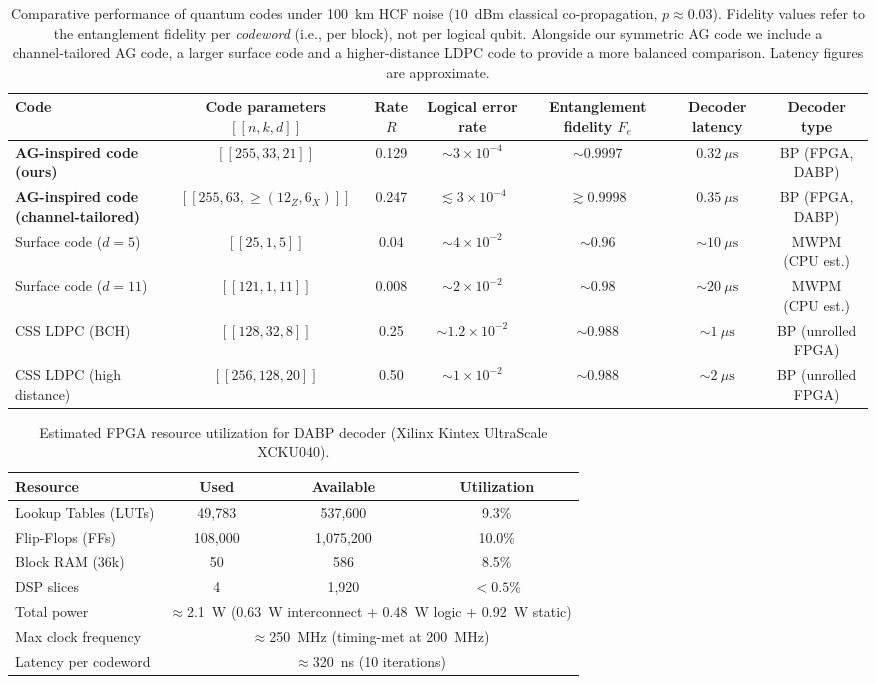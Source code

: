 \documentclass[conference]{IEEEtran}  %
\begin{document}
\begin{table*}[t]
\centering
\caption{Comparative performance of quantum codes under 100~km HCF noise ($10$~dBm classical co-propagation, $p\approx 0.03$).  Fidelity values refer to the entanglement fidelity per \emph{codeword} (i.e., per block), not per logical qubit.  Alongside our symmetric AG code we include a channel‑tailored AG code, a larger surface code and a higher-distance LDPC code to provide a more balanced comparison.  Latency figures are approximate.}
\label{tab:perf}
\begin{tabular}{lcccccc}
\hline
\textbf{Code} & \textbf{Code parameters $[[n,k,d]]$} & \textbf{Rate $R$} & \textbf{Logical error rate} & \textbf{Entanglement fidelity $F_e$} & \textbf{Decoder latency} & \textbf{Decoder type} \\
\hline
\textbf{AG-inspired code (ours)} & $[[255,33,21]]$ & 0.129 & $\sim3\times 10^{-4}$ & $\sim0.9997$ & $0.32~\mu\text{s}$ & BP (FPGA, DABP) \\
\textbf{AG-inspired code (channel-tailored)} & $[[255,63,\ge(12_Z,6_X)]]$ & 0.247 & $\lesssim3\times 10^{-4}$ & $\gtrsim0.9998$ & $0.35~\mu\text{s}$ & BP (FPGA, DABP) \\
Surface code ($d=5$) & $[[25,1,5]]$ & 0.04 & $\sim4\times 10^{-2}$ & $\sim0.96$ & $\sim10~\mu\text{s}$ & MWPM (CPU est.) \\
Surface code ($d=11$) & $[[121,1,11]]$ & 0.008 & $\sim2\times 10^{-2}$ & $\sim0.98$ & $\sim20~\mu\text{s}$ & MWPM (CPU est.) \\
CSS LDPC (BCH) & $[[128,32,8]]$ & 0.25 & $\sim1.2\times 10^{-2}$ & $\sim0.988$ & $\sim1~\mu\text{s}$ & BP (unrolled FPGA) \\
CSS LDPC (high distance) & $[[256,128,20]]$ & 0.50 & $\sim1\times 10^{-2}$ & $\sim0.988$ & $\sim2~\mu\text{s}$ & BP (unrolled FPGA) \\
\hline
\end{tabular}
\end{table*}

\begin{table}[t]
\centering
\caption{Estimated FPGA resource utilization for DABP decoder (Xilinx Kintex UltraScale XCKU040).}
\label{tab:resources}
\begin{tabular}{lccc}
\hline
\textbf{Resource} & \textbf{Used} & \textbf{Available} & \textbf{Utilization} \\
\hline
Lookup Tables (LUTs) & 49,783 & 537,600 & 9.3\% \\
Flip-Flops (FFs) & 108,000 & 1,075,200 & 10.0\% \\
Block RAM (36k) & 50 & 586 & 8.5\% \\
DSP slices & 4 & 1,920 & $<0.5$\% \\
Total power & \multicolumn{3}{c}{$\approx$2.1~W (0.63~W interconnect + 0.48~W logic + 0.92~W static)} \\
Max clock frequency & \multicolumn{3}{c}{$\approx$250~MHz (timing-met at 200~MHz)} \\
Latency per codeword & \multicolumn{3}{c}{$\approx$320~ns (10 iterations)} \\
\hline
\end{tabular}
\end{table}
\end{document}
